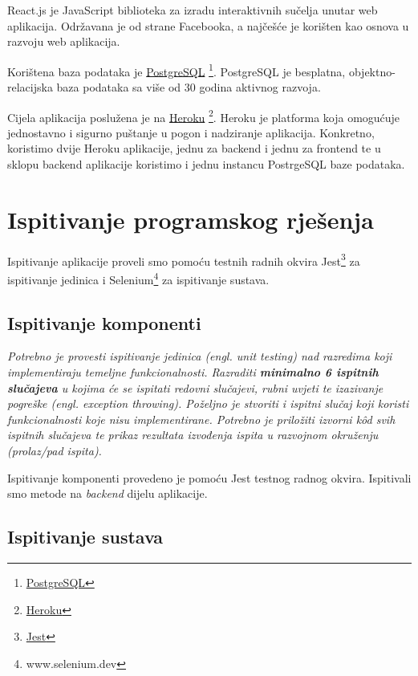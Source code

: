             React.js je JavaScript biblioteka za izradu interaktivnih sučelja unutar web aplikacija. Održavana je od strane Facebooka, a najčešće je korišten kao osnova u razvoju web aplikacija.
            
            Korištena baza podataka je \underline{PostgreSQL} \footnote{\href{https://www.postgresql.org/}{PostgreSQL}}. PostgreSQL je besplatna, objektno-relacijska baza podataka sa više od 30 godina aktivnog razvoja.
            
            Cijela aplikacija poslužena je na \underline{Heroku} \footnote{\href{https://www.heroku.com/home}{Heroku}}. Heroku je platforma koja omogućuje jednostavno i sigurno puštanje  u pogon i nadziranje aplikacija. Konkretno, koristimo dvije Heroku aplikacije, jednu za backend i jednu za frontend te u sklopu backend aplikacije koristimo i jednu instancu PostrgeSQL baze podataka.
			
			\eject 
		
	
		\section{Ispitivanje programskog rješenja}
			
			Ispitivanje aplikacije proveli smo pomoću testnih radnih okvira Jest\footnote{\href{https://jestjs.io/}{Jest}} za ispitivanje jedinica i Selenium\footnote{www.selenium.dev} za ispitivanje sustava.
	
			
			\subsection{Ispitivanje komponenti}
			\textit{Potrebno je provesti ispitivanje jedinica (engl. unit testing) nad razredima koji implementiraju temeljne funkcionalnosti. Razraditi \textbf{minimalno 6 ispitnih slučajeva} u kojima će se ispitati redovni slučajevi, rubni uvjeti te izazivanje pogreške (engl. exception throwing). Poželjno je stvoriti i ispitni slučaj koji koristi funkcionalnosti koje nisu implementirane. Potrebno je priložiti izvorni kôd svih ispitnih slučajeva te prikaz rezultata izvođenja ispita u razvojnom okruženju (prolaz/pad ispita). }
			
			Ispitivanje komponenti provedeno je pomoću Jest testnog radnog okvira. Ispitivali smo metode na \textit{backend} dijelu aplikacije.
			
			
			
			\subsection{Ispitivanje sustava}
			
